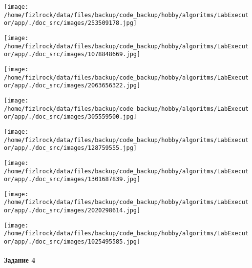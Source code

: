 \documentclass[a4paper, 12pt]{article}
\begin{document}
\texttt{[image: /home/fizlrock/data/files/backup/code\_backup/hobby/algoritms/LabExecutor/app/./doc\_src/images/253509178.jpg]}

\texttt{[image: /home/fizlrock/data/files/backup/code\_backup/hobby/algoritms/LabExecutor/app/./doc\_src/images/1078848669.jpg]}

\texttt{[image: /home/fizlrock/data/files/backup/code\_backup/hobby/algoritms/LabExecutor/app/./doc\_src/images/2063656322.jpg]}

\texttt{[image: /home/fizlrock/data/files/backup/code\_backup/hobby/algoritms/LabExecutor/app/./doc\_src/images/305559500.jpg]}

\texttt{[image: /home/fizlrock/data/files/backup/code\_backup/hobby/algoritms/LabExecutor/app/./doc\_src/images/128759555.jpg]}

\texttt{[image: /home/fizlrock/data/files/backup/code\_backup/hobby/algoritms/LabExecutor/app/./doc\_src/images/1301687839.jpg]}

\texttt{[image: /home/fizlrock/data/files/backup/code\_backup/hobby/algoritms/LabExecutor/app/./doc\_src/images/2020298614.jpg]}

\texttt{[image: /home/fizlrock/data/files/backup/code\_backup/hobby/algoritms/LabExecutor/app/./doc\_src/images/1025495585.jpg]}
\pagebreak
\paragraph{Задание 4}
\end{document}
